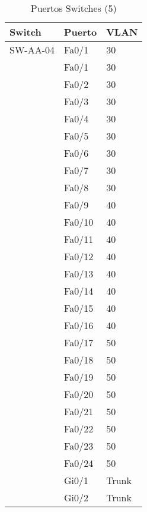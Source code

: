 \documentclass[a4paper,onecolumn,11pt]{article}
\begin{document}
\begin{table}[htbp]
\small \sffamily
\caption{Puertos Switches (5)}
\begin{center}
\begin{tabular}{p{}p{}p{}}
\toprule
\textbf{Switch} & \textbf{Puerto} & \textbf{VLAN}  \\
\toprule
SW-AA-04 & Fa0/1 & 30 \\ %
& Fa0/1 & 30\\
& Fa0/2 & 30\\
& Fa0/3 & 30\\
& Fa0/4 & 30\\
& Fa0/5 & 30\\
& Fa0/6 & 30\\
& Fa0/7 & 30\\
& Fa0/8 & 30\\
& Fa0/9 & 40\\
& Fa0/10 & 40\\
& Fa0/11 & 40\\
& Fa0/12 & 40\\
& Fa0/13 & 40\\
& Fa0/14 & 40\\
& Fa0/15 & 40\\
& Fa0/16 & 40\\
& Fa0/17 & 50\\
& Fa0/18 & 50\\
& Fa0/19 & 50\\
& Fa0/20 & 50\\
& Fa0/21 & 50\\
& Fa0/22 & 50\\
& Fa0/23 & 50\\
& Fa0/24 & 50\\
& Gi0/1 & Trunk  \\
& Gi0/2 & Trunk  \\ 
\bottomrule
\end{tabular}
\end{center}
\label{tab:puertos4}
\end{table}
\end{document}
